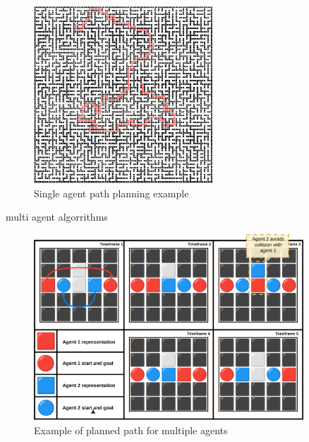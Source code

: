 \begin{figure}[H]
    \centering
    \includegraphics[width=0.6\textwidth]{pictures/single_path_maze.png}
    \caption{ Single agent path planning example} 
    \label{fig:single_agent_path}
\end{figure}


multi agent algorrithms

\begin{figure}[H]
    \centering
    \includegraphics[width=0.9\textwidth]{pictures/example_planning.png}
    \caption{ Example of planned path for multiple agents } 
    \label{fig:multiple_agent_path}
\end{figure}